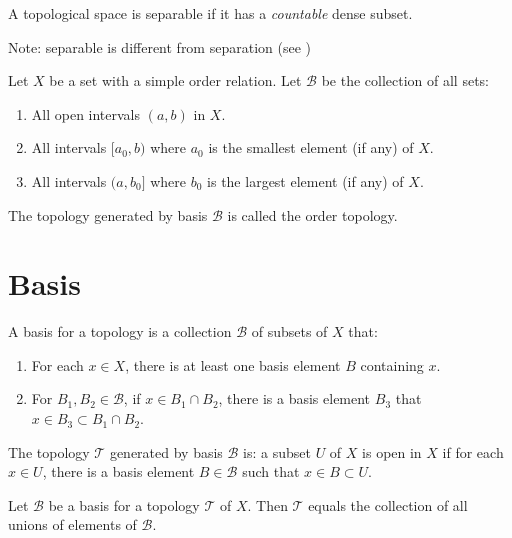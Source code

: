 \begin{definition}\label{separable}
    A topological space is separable if it has a \emph{countable} dense subset.
    
    Note: separable is different from separation (see )
\end{definition}


\begin{definition}
    Let $X$ be a set with a simple order relation. Let $\mathcal{B}$ be the collection of all sets:
    \begin{enumerate}
        \item All open intervals $(a,b)$ in $X$.
        \item All intervals $[a_0, b)$ where $a_0$ is the smallest element (if any) of $X$.
        \item All intervals $(a, b_0]$ where $b_0$ is the largest element (if any) of $X$.
    \end{enumerate}
    The topology generated by basis $\mathcal{B}$ is called the order topology.
\end{definition}


\section{Basis}

\begin{definition}
    A basis for a topology is a collection $\mathcal{B}$ of subsets of $X$ that:
    \begin{enumerate}
        \item For each $x \in X$, there is at least one basis element $B$ containing $x$.
        \item For $B_1, B_2 \in \mathcal{B}$, if $x \in B_1 \cap B_2$, there is a basis element $B_3$ that $x \in B_3 \subset B_1 \cap B_2$.
    \end{enumerate}
\end{definition}

The topology $\mathcal{T}$ generated by basis $\mathcal{B}$ is: a subset $U$ of $X$ is open in $X$ if for each $x \in U$, there is a basis element $B \in \mathcal{B}$ such that $x \in B \subset U$.




\begin{theorem}
    Let $\mathcal{B}$ be a basis for a topology $\mathcal{T}$ of $X$. Then $\mathcal{T}$ equals the collection of all unions of elements of $\mathcal{B}$.
\end{theorem}



